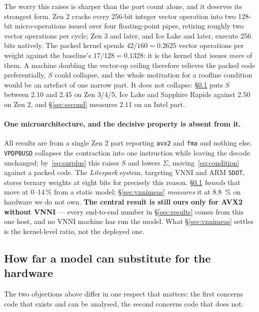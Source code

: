 \documentclass[11pt,a4paper]{article}
\newcommand{\code}[1]{\texttt{#1}}
\begin{document}
The worry this raises is sharper than the port count alone, and it deserves its
strongest form. Zen 2 cracks every 256-bit integer vector operation into two
128-bit micro-operations issued over four floating-point pipes, retiring roughly
two vector operations per cycle; Zen 3 and later, and Ice Lake and later,
execute 256 bits natively. The packed kernel spends $42/160=\num{0.2625}$ vector
operations per weight against the baseline's $17/128=\num{0.1328}$: it is the
kernel that issues \emph{more} of them. A machine doubling the vector-op ceiling
therefore relieves the packed code preferentially, $S$ could collapse, and the
whole motivation for a roofline condition would be an artefact of one narrow
part. It does not collapse: \S\ref{sec:microarch} puts $S$ between \num{2.10}
and \num{2.45} on Zen 3/4/5, Ice Lake and Sapphire Rapids against \num{2.50} on
Zen 2, and \S\ref{sec:second} measures \num{2.11} on an Intel part.

\paragraph{One microarchitecture, and the decisive property is absent from it.}
All results are from a single Zen 2 part reporting \code{avx2} and \code{fma}
and nothing else. \code{VPDPBUSD} collapses the contraction into one instruction
while leaving the decode unchanged; by~\eqref{eq:surplus} this raises $S$ and
lowers $\Sigma$, moving~\eqref{eq:condition} against a packed code. The
\emph{Litespark} system, targeting VNNI and ARM \code{SDOT}, stores ternary
weights at eight bits for precisely this reason. \S\ref{sec:microarch}
\emph{bounds} that move at \numrange{0}{14}\,\% from a static model;
\S\ref{sec:vnnimeas} \emph{measures} it at \SI{8.8}{\percent} on hardware we do
not own. \textbf{The central result is still ours only for AVX2 without VNNI}
--- every end-to-end number in \S\ref{sec:results} comes from this one host, and
no VNNI machine has run the model. What \S\ref{sec:vnnimeas} settles is the
kernel-level ratio, not the deployed one.

\subsection{How far a model can substitute for the hardware}\label{sec:microarch}

The two objections above differ in one respect that matters: the first concerns
code that exists and can be analysed, the second concerns code that does not.
\end{document}

